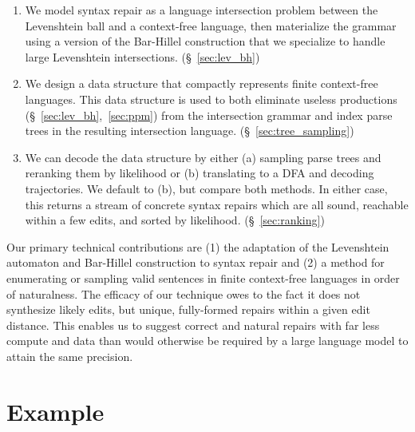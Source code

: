 \documentclass[sigplan,acmsmall,nonacm,screen]{acmart}\settopmatter{printfolios=false,printccs=false,printacmref=false}
\begin{document}
  \begin{enumerate}
    \item We model syntax repair as a language intersection problem between the Levenshtein ball and a context-free language, then materialize the grammar using a version of the Bar-Hillel construction that we specialize to handle large Levenshtein intersections. (\S~\ref{sec:lev_bh})
    \item We design a data structure that compactly represents finite context-free languages. This data structure is used to both eliminate useless productions (\S~\ref{sec:lev_bh},~\ref{sec:ppm}) from the intersection grammar and index parse trees in the resulting intersection language. (\S~\ref{sec:tree_sampling})
    \item We can decode the data structure by either (a) sampling parse trees and reranking them by likelihood or (b) translating to a DFA and decoding trajectories. We default to (b), but compare both methods. In either case, this returns a stream of concrete syntax repairs which are all sound, reachable within a few edits, and sorted by likelihood. (\S~\ref{sec:ranking})
  \end{enumerate}

  Our primary technical contributions are (1) the adaptation of the Levenshtein automaton and Bar-Hillel construction to syntax repair and (2) a method for enumerating or sampling valid sentences in finite context-free languages in order of naturalness. The efficacy of our technique owes to the fact it does not synthesize likely edits, but unique, fully-formed repairs within a given edit distance. This enables us to suggest correct and natural repairs with far less compute and data than would otherwise be required by a large language model to attain the same precision.

  \section{Example}\label{sec:example}
\end{document}

